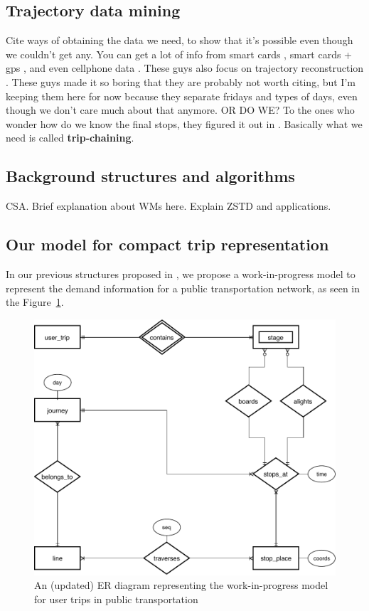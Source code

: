 \documentclass[runningheads]{llncs}
\begin{document}
\subsection{Trajectory data mining}
Cite ways of obtaining the data we need, to show that it's possible even though we couldn't get any. You can get a lot of info from smart cards \cite{bhaskar2015passenger}, smart cards + gps \cite{ma2014development}, and even cellphone data \cite{liu2017exploring}. These guys also focus on trajectory reconstruction \cite{tao2014exploring}. These guys \cite{wang2014aggregated} made it so boring that they are probably not worth citing, but I'm keeping them here for now because they separate fridays and types of days, even though we don't care much about that anymore. OR DO WE? To the ones who wonder how do we know the final stops, they figured it out in \cite{alsger2016validating}. Basically what we need is called \textbf{trip-chaining}.

\subsection{Background structures and algorithms}
CSA. Brief explanation about WMs here. Explain ZSTD and applications.

\subsection{Our model for compact trip representation}
In our previous structures proposed in \cite{brisaboa2018new}, we propose a work-in-progress model to represent the demand information for a public transportation network, as seen in the Figure~\ref{fig:er}.

\begin{figure}
\includegraphics[width=\textwidth]{NetworkER.pdf}
\caption{An (updated) ER diagram representing the work-in-progress model for user trips in public transportation}
\label{fig:er}
\end{figure}
\end{document}
